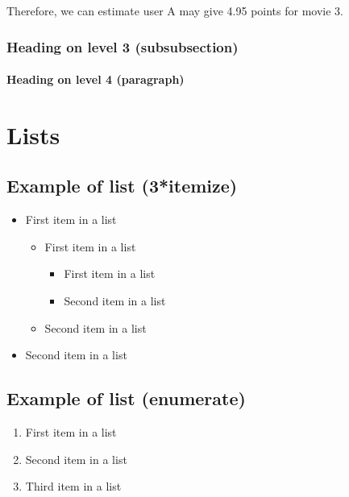 \documentclass[paper=a4, fontsize=11pt]{scrartcl} %
\numberwithin{equation}{section} %
\numberwithin{figure}{section} %
\numberwithin{table}{section} %
\begin{document}
Therefore, we can estimate user A may give 4.95 points for movie 3.



\subsubsection{Heading on level 3 (subsubsection)}

\lipsum[3] %

\paragraph{Heading on level 4 (paragraph)}

\lipsum[6] %


\section{Lists}


\subsection{Example of list (3*itemize)}
\begin{itemize}
	\item First item in a list
		\begin{itemize}
		\item First item in a list
			\begin{itemize}
			\item First item in a list
			\item Second item in a list
			\end{itemize}
		\item Second item in a list
		\end{itemize}
	\item Second item in a list
\end{itemize}


\subsection{Example of list (enumerate)}
\begin{enumerate}
\item First item in a list
\item Second item in a list
\item Third item in a list
\end{enumerate}

\end{document}
